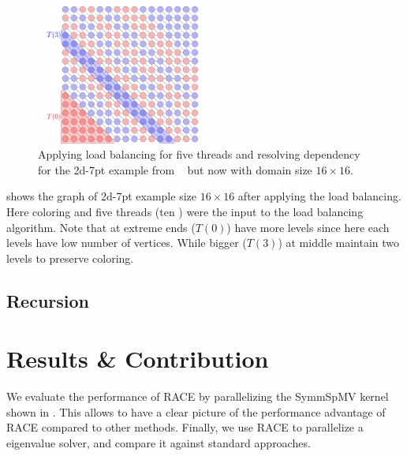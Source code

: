   \setlength{\belowcaptionskip}{-10pt}
  \begin{figure}[t]
  	\begin{minipage}[c]{0.26\textwidth}
  	\includegraphics[height=12.4em,width=15.2em]{pics/race_method/load_balancing}
  	\end{minipage}\hspace{2.2em}
  	 \begin{minipage}[c]{0.16\textwidth}
  	\caption{\label{fig:lb} Applying load balancing for five threads and resolving \DTWO
  		dependency for the 2d-7pt example from ~ but now with domain size $16\times16$.  }
  	\end{minipage}
  \end{figure}
   \setlength{\belowcaptionskip}{0pt}
   
   shows the graph of 2d-7pt example size $16\times16$ after
   applying the load balancing. Here \DTWO coloring and five threads
    (\ie ten \levelGroups) were the input to the load balancing algorithm.
    Note that \levelGroups at extreme ends (\eg $T(0)$) have more levels
    since here each levels have low number of vertices. While bigger \levelGroups
    (\eg $T(3)$) at middle maintain two levels to preserve \DK coloring.
    
\subsection{Recursion}


\section{Results \& Contribution} \label{sec:results}
We evaluate the performance of \acrshort{RACE} by parallelizing the \acrshort{SymmSpMV}
kernel shown in . This allows to have a clear picture of the
performance advantage of \acrshort{RACE} compared to other methods. Finally,
 we use \acrshort{RACE} to parallelize a eigenvalue solver, 
and compare it against standard approaches.

